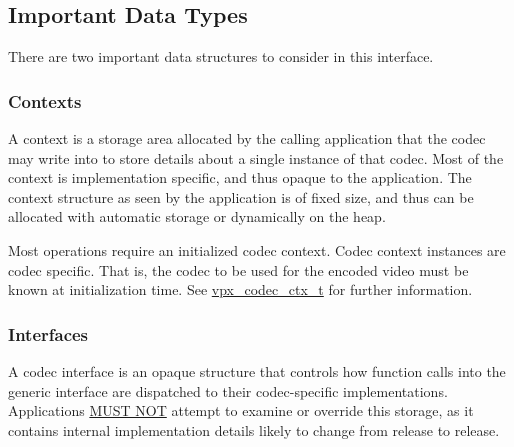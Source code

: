 \hypertarget{usage_usage_types}{}\subsection{Important Data Types}\label{usage_usage_types}
There are two important data structures to consider in this interface.\hypertarget{usage_usage_ctxs}{}\subsubsection{Contexts}\label{usage_usage_ctxs}
A context is a storage area allocated by the calling application that the codec may write into to store details about a single instance of that codec. Most of the context is implementation specific, and thus opaque to the application. The context structure as seen by the application is of fixed size, and thus can be allocated with automatic storage or dynamically on the heap.

Most operations require an initialized codec context. Codec context instances are codec specific. That is, the codec to be used for the encoded video must be known at initialization time. See \hyperlink{group__codec_gad03e2dfa6ae511db7d25be6bbb336233}{vpx\-\_\-codec\-\_\-ctx\-\_\-t} for further information.\hypertarget{usage_usage_ifaces}{}\subsubsection{Interfaces}\label{usage_usage_ifaces}
A codec interface is an opaque structure that controls how function calls into the generic interface are dispatched to their codec-\/specific implementations. Applications \hyperlink{rfc2119_MUSTNOT}{M\-U\-S\-T N\-O\-T} attempt to examine or override this storage, as it contains internal implementation details likely to change from release to release.

